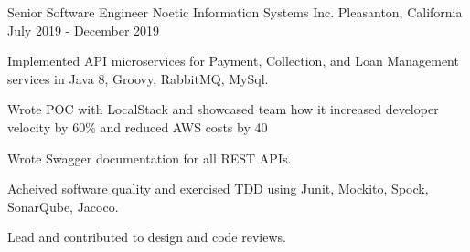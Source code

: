 \begin{cventries}
  \cventry
    {Senior Software Engineer} %
    {Noetic Information Systems Inc.} %
    {Pleasanton, California} %
    {July 2019 - December 2019} %
    {
      \begin{cvitems} %
        \item {Implemented API microservices for Payment, Collection, and Loan Management services in Java 8, Groovy, RabbitMQ, MySql.}
        \item {Wrote POC with LocalStack and showcased team how it increased developer velocity by 60\% and reduced AWS costs by 40%
        \item {Wrote Swagger documentation for all REST APIs.}
        \item {Acheived software quality and exercised TDD using Junit, Mockito, Spock, SonarQube, Jacoco.}
        \item {Lead and contributed to design and code reviews.}}
      \end{cvitems}
    }


\end{cventries}

